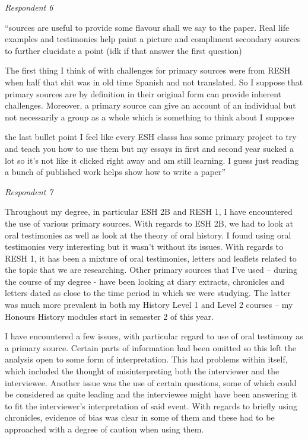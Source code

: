 \documentclass{l4proj}
\begin{document}
\begin{appendices}
\emph{Respondent 6}

“sources are useful to provide some flavour shall we say to the paper. Real life examples and testimonies help paint a picture and compliment secondary sources to further elucidate a point (idk if that answer the first question)

The first thing I think of with challenges for primary sources were from RESH when half that shit was in old time Spanish and not translated. So I suppose that primary sources are by definition in their original form can provide inherent challenges. Moreover, a primary source can give an account of an individual but not necessarily a group as a whole which is something to think about I suppose

the last bullet point I feel like every ESH classs has some primary project to try and teach you how to use them but my essays in first and second year sucked a lot so it's not like it clicked right away and am still learning. I guess just reading a bunch of published work helps show how to write a paper”

\emph{Respondent 7}

Throughout my degree, in particular ESH 2B and RESH 1, I have encountered the use of various primary sources. With regards to ESH 2B, we had to look at oral testimonies as well as look at the theory of oral history. I found using oral testimonies very interesting but it wasn’t without its issues. With regards to RESH 1, it has been a mixture of oral testimonies, letters and leaflets related to the topic that we are researching. Other primary sources that I’ve used – during the course of my degree - have been looking at diary extracts, chronicles and letters dated as close to the time period in which we were studying. The latter was much more prevalent in both my History Level 1 and Level 2 courses – my Honours History modules start in semester 2 of this year.

I have encountered a few issues, with particular regard to use of oral testimony as a primary source. Certain parts of information had been omitted so this left the analysis open to some form of interpretation. This had problems within itself, which included the thought of misinterpreting both the interviewer and the interviewee. Another issue was the use of certain questions, some of which could be considered as quite leading and the interviewee might have been answering it to fit the interviewer’s interpretation of said event. With regards to briefly using chronicles, evidence of bias was clear in some of them and these had to be approached with a degree of caution when using them.


\end{appendices}
\end{document}
